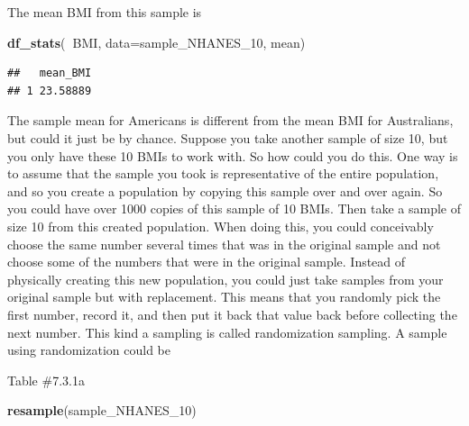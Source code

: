 \documentclass[
]{book}
\newenvironment{Shaded}{\begin{snugshade}}{\end{snugshade}}
\newcommand{\DataTypeTok}[1]{\textcolor[rgb]{0.13,0.29,0.53}{#1}}
\newcommand{\DecValTok}[1]{\textcolor[rgb]{0.00,0.00,0.81}{#1}}
\newcommand{\KeywordTok}[1]{\textcolor[rgb]{0.13,0.29,0.53}{\textbf{#1}}}
\newcommand{\NormalTok}[1]{#1}
\newcommand{\OperatorTok}[1]{\textcolor[rgb]{0.81,0.36,0.00}{\textbf{#1}}}
\begin{document}
The mean BMI from this sample is

\begin{Shaded}
\begin{Highlighting}[]
\KeywordTok{df_stats}\NormalTok{(}\OperatorTok{~}\NormalTok{BMI, }\DataTypeTok{data=}\NormalTok{sample_NHANES_}\DecValTok{10}\NormalTok{, mean)}
\end{Highlighting}
\end{Shaded}

\begin{verbatim}
##   mean_BMI
## 1 23.58889
\end{verbatim}

The sample mean for Americans is different from the mean BMI for Australians, but could it just be by chance. Suppose you take another sample of size 10, but you only have these 10 BMIs to work with. So how could you do this. One way is to assume that the sample you took is representative of the entire population, and so you create a population by copying this sample over and over again. So you could have over 1000 copies of this sample of 10 BMIs. Then take a sample of size 10 from this created population. When doing this, you could conceivably choose the same number several times that was in the original sample and not choose some of the numbers that were in the original sample. Instead of physically creating this new population, you could just take samples from your original sample but with replacement. This means that you randomly pick the first number, record it, and then put it back that value back before collecting the next number. This kind a sampling is called randomization sampling. A sample using randomization could be

Table \#7.3.1a

\begin{Shaded}
\begin{Highlighting}[]
\KeywordTok{resample}\NormalTok{(sample_NHANES_}\DecValTok{10}\NormalTok{)}
\end{Highlighting}
\end{Shaded}
\end{document}
